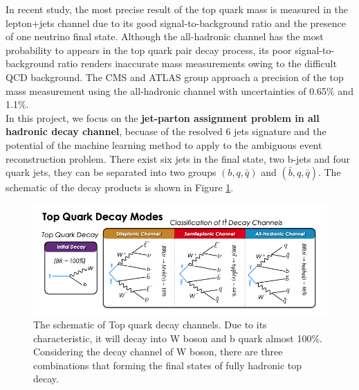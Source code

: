 In recent study, the most precise result of the top quark mass is measured in the lepton+jets channel due to its good signal-to-background ratio and the presence of one neutrino final state\cite{Mccarthy:2015ucy}. Although the all-hadronic channel has the most probability to appears in the top quark pair decay process, its poor signal-to-background ratio renders inaccurate mass measurements owing to the difficult QCD background. The CMS and ATLAS group approach a precision of the top mass measurement using the all-hadronic channel with uncertainties of 0.65\% and 1.1\%\cite{Sirunyan:2018mlv}\cite{Aaboud:2017mae}.
\\
\newline
In this project, we focus on the \textbf{jet-parton assignment problem in all hadronic decay channel}, becuase of the resolved 6 jets signature and the potential of the machine learning method to apply to the ambiguous event reconstruction problem. There exist six jets in the final state, two b-jets and four quark jets, they can be separated into two groups $\left(b, q, \bar{q}\right)$ and $\left(\bar{b}, q, \bar{q}\right)$. The schematic of the decay products is shown in Figure  \ref{fig:ttbardecaymode}. 
\begin{figure}[h]
	\centering
	\includegraphics[width=0.8\linewidth]{Figures/ttbar-decay-mode.png}
	\caption{The schematic of Top quark decay channels\cite{Mccarthy:2015ucy}. Due to its characteristic, it will decay into W boson and b quark almost 100\%. Considering the decay channel of W boson, there are three combinations that forming the final states of fully hadronic top decay.}
	\label{fig:ttbardecaymode}
\end{figure}
